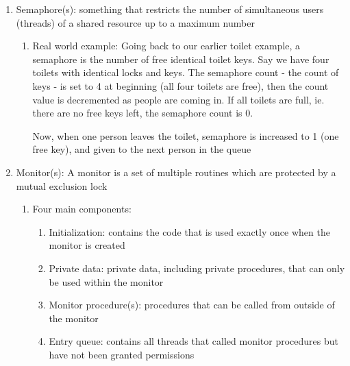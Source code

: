 \documentclass [12pt, executivepaper]{article}
\begin{document}
\begin{enumerate}
\begin{enumerate}
\end{enumerate} 

\item Semaphore(s): something that restricts the number of simultaneous users (threads) of a shared resource up to a maximum number

\begin{enumerate}

\item Real world example: Going back to our earlier toilet example, a semaphore is the number of free identical toilet keys. Say we have four toilets with identical locks and keys. The semaphore count - the count of keys - is set to 4 at beginning (all four toilets are free), then the count value is decremented as people are coming in. If all toilets are full, ie. there are no free keys left, the semaphore count is 0. 

\pagebreak

\vspace*{-40mm}

Now, when one person leaves the toilet, semaphore is increased to 1 (one free key), and given to the next person in the queue

\end{enumerate}

\item Monitor(s): A monitor is a set of multiple routines which are protected by a mutual exclusion lock

\begin{enumerate}

\item Four main components:

\begin{enumerate}

\item Initialization: contains the code that is used exactly once when the monitor is created

\item Private data: private data, including private procedures, that can only be used within the monitor

\item Monitor procedure(s): procedures that can be called from outside of the monitor

\item Entry queue: contains all threads that called monitor procedures but have not been granted permissions 

\end{enumerate}


\end{enumerate}
\end{enumerate}
\end{document}
